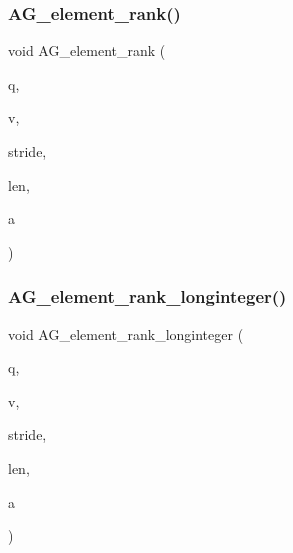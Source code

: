 \subsubsection{\texorpdfstring{A\+G\+\_\+element\+\_\+rank()}{AG\_element\_rank()}}
{\footnotesize\ttfamily void A\+G\+\_\+element\+\_\+rank (\begin{DoxyParamCaption}\item[{\mbox{\hyperlink{galois_8h_a09fddde158a3a20bd2dcadb609de11dc}{I\+NT}}}]{q,  }\item[{\mbox{\hyperlink{galois_8h_a09fddde158a3a20bd2dcadb609de11dc}{I\+NT}} $\ast$}]{v,  }\item[{\mbox{\hyperlink{galois_8h_a09fddde158a3a20bd2dcadb609de11dc}{I\+NT}}}]{stride,  }\item[{\mbox{\hyperlink{galois_8h_a09fddde158a3a20bd2dcadb609de11dc}{I\+NT}}}]{len,  }\item[{\mbox{\hyperlink{galois_8h_a09fddde158a3a20bd2dcadb609de11dc}{I\+NT}} \&}]{a }\end{DoxyParamCaption})}

\mbox{\label{projective_8_c_ac13377076b1f78e7a883eade63d2d6f6}} 
\subsubsection{\texorpdfstring{A\+G\+\_\+element\+\_\+rank\+\_\+longinteger()}{AG\_element\_rank\_longinteger()}}
{\footnotesize\ttfamily void A\+G\+\_\+element\+\_\+rank\+\_\+longinteger (\begin{DoxyParamCaption}\item[{\mbox{\hyperlink{galois_8h_a09fddde158a3a20bd2dcadb609de11dc}{I\+NT}}}]{q,  }\item[{\mbox{\hyperlink{galois_8h_a09fddde158a3a20bd2dcadb609de11dc}{I\+NT}} $\ast$}]{v,  }\item[{\mbox{\hyperlink{galois_8h_a09fddde158a3a20bd2dcadb609de11dc}{I\+NT}}}]{stride,  }\item[{\mbox{\hyperlink{galois_8h_a09fddde158a3a20bd2dcadb609de11dc}{I\+NT}}}]{len,  }\item[{\mbox{\hyperlink{classlonginteger__object}{longinteger\+\_\+object}} \&}]{a }\end{DoxyParamCaption})}

